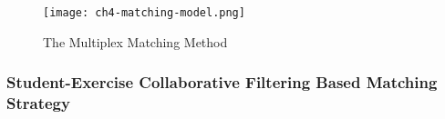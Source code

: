 \begin{figure}[h]
  \centering
  \texttt{[image: ch4-matching-model.png]}
  \caption{The Multiplex Matching Method}\label{fig:ch4-matching-1}
\end{figure}

\subsubsection{Student-Exercise Collaborative Filtering Based Matching Strategy}




